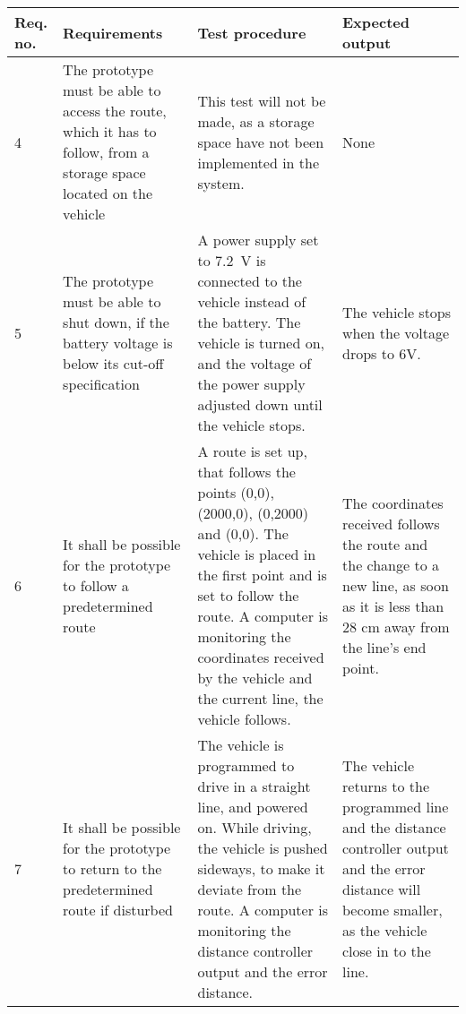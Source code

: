 \begin{table}[H] \centering
\begin{tabular}{|p{1cm}|p{4cm}|p{7cm}|p{3cm}|}
\hline
\textbf{Req. no.}  &  \textbf{Requirements} &  \textbf{Test procedure}  &  \textbf{Expected output}        \\
\hline
           4    &   The prototype must be able to access the route, which it has to follow, from a storage space located on the vehicle & This test will not be made, as a storage space have not been implemented in the system.   & None                 \\
\hline%
           5    &   The prototype must be able to shut down, if the battery voltage is below its cut-off specification &   A power supply set to \SI{7,2}{V} is connected to the vehicle instead of the battery. The vehicle is turned on, and the voltage of the power supply adjusted down until the vehicle stops.   &   The vehicle stops when the voltage drops to 6V.               \\
\hline
           6    &   It shall be possible for the prototype to follow a predetermined route &   A route is set up, that follows the points (0,0), (2000,0), (0,2000) and (0,0). The vehicle is placed in the first point and is set to follow the route. A computer is monitoring the coordinates received by the vehicle and the current line, the vehicle follows.  &  The coordinates received follows the route and the change to a new line, as soon as it is less than 28 cm away from the line's end point. \\
\hline%
           7    &   It shall be possible for the prototype to return to the predetermined route if disturbed   &  The vehicle is programmed to drive in a straight line, and powered on. While driving, the vehicle is pushed sideways, to make it deviate from the route. A computer is monitoring the distance controller output and the error distance.    &   The vehicle returns to the programmed line and the distance controller output and the error distance will become smaller, as the vehicle close in to the line.            \\ 

\end{tabular}
\end{table}
